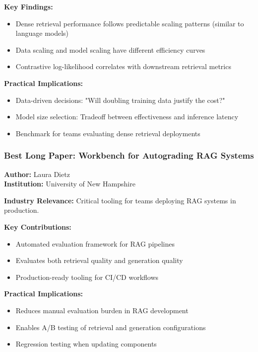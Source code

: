\documentclass[11pt,letterpaper]{article}
\begin{document}
\textbf{Key Findings:}
\begin{itemize}[leftmargin=*]
    \item Dense retrieval performance follows predictable scaling patterns (similar to language models)
    \item Data scaling and model scaling have different efficiency curves
    \item Contrastive log-likelihood correlates with downstream retrieval metrics
\end{itemize}

\textbf{Practical Implications:}
\begin{itemize}[leftmargin=*]
    \item Data-driven decisions: "Will doubling training data justify the cost?"
    \item Model size selection: Tradeoff between effectiveness and inference latency
    \item Benchmark for teams evaluating dense retrieval deployments
\end{itemize}

\subsubsection{Best Long Paper: Workbench for Autograding RAG Systems}
\textbf{Author:} Laura Dietz\\
\textbf{Institution:} University of New Hampshire

\textbf{Industry Relevance:} Critical tooling for teams deploying RAG systems in production.

\textbf{Key Contributions:}
\begin{itemize}[leftmargin=*]
    \item Automated evaluation framework for RAG pipelines
    \item Evaluates both retrieval quality and generation quality
    \item Production-ready tooling for CI/CD workflows
\end{itemize}

\textbf{Practical Implications:}
\begin{itemize}[leftmargin=*]
    \item Reduces manual evaluation burden in RAG development
    \item Enables A/B testing of retrieval and generation configurations
    \item Regression testing when updating components
\end{itemize}
\end{document}
